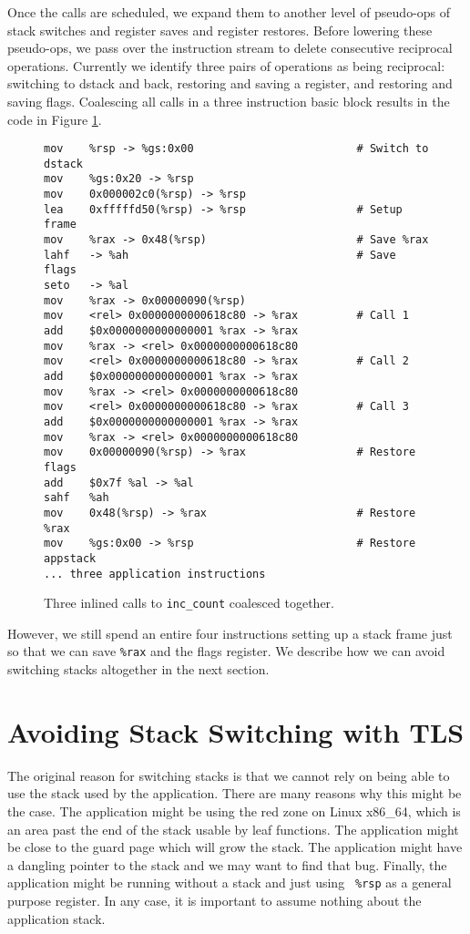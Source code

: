 Once the calls are scheduled, we expand them to another level of pseudo-ops of
stack switches and register saves and register restores.  Before lowering these
pseudo-ops, we pass over the instruction stream to delete consecutive reciprocal
operations.  Currently we identify three pairs of operations as being
reciprocal: switching to dstack and back, restoring and saving a register, and
restoring and saving flags.  Coalescing all calls in a three instruction basic
block results in the code in Figure \ref{fig:inscount_coalesced}.

\begin{figure}
\begin{verbatim}
mov    %rsp -> %gs:0x00                         # Switch to dstack
mov    %gs:0x20 -> %rsp 
mov    0x000002c0(%rsp) -> %rsp 
lea    0xfffffd50(%rsp) -> %rsp                 # Setup frame
mov    %rax -> 0x48(%rsp)                       # Save %rax
lahf   -> %ah                                   # Save flags
seto   -> %al 
mov    %rax -> 0x00000090(%rsp) 
mov    <rel> 0x0000000000618c80 -> %rax         # Call 1
add    $0x0000000000000001 %rax -> %rax 
mov    %rax -> <rel> 0x0000000000618c80 
mov    <rel> 0x0000000000618c80 -> %rax         # Call 2
add    $0x0000000000000001 %rax -> %rax 
mov    %rax -> <rel> 0x0000000000618c80 
mov    <rel> 0x0000000000618c80 -> %rax         # Call 3
add    $0x0000000000000001 %rax -> %rax 
mov    %rax -> <rel> 0x0000000000618c80 
mov    0x00000090(%rsp) -> %rax                 # Restore flags
add    $0x7f %al -> %al 
sahf   %ah 
mov    0x48(%rsp) -> %rax                       # Restore %rax
mov    %gs:0x00 -> %rsp                         # Restore appstack
... three application instructions
\end{verbatim}
\caption{Three inlined calls to {\tt inc\_count} coalesced together.}
\label{fig:inscount_coalesced}
\end{figure}

However, we still spend an entire four instructions setting up a stack frame
just so that we can save {\tt \%rax} and the flags register.  We describe how we
can avoid switching stacks altogether in the next section.

\section{Avoiding Stack Switching with TLS}
\label{sec:tls_scratch}

The original reason for switching stacks is that we cannot rely on being able to
use the stack used by the application.  There are many reasons why this might be
the case.  The application might be using the red zone on Linux x86\_64, which
is an area past the end of the stack usable by leaf functions.  The application
might be close to the guard page which will grow the stack.  The application
might have a dangling pointer to the stack and we may want to find that bug.
Finally, the application might be running without a stack and just using {\tt
\%rsp} as a general purpose register.  In any case, it is important to assume
nothing about the application stack.

